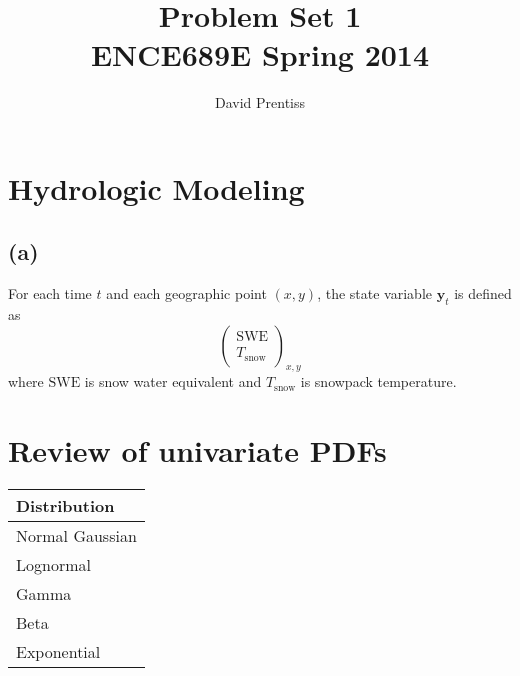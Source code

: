 \documentclass[letterpaper]{tufte-handout}
\title{Problem Set 1 \\ ENCE689E Spring 2014}
\author{David Prentiss}
\begin{document}
\maketitle


\section{Hydrologic Modeling}
\subsection{(a)}
For each time $t$ and each geographic point $(x,y)$, the state variable $\mathbf{y}_t$ is defined as
\[
\begin{pmatrix}
  \text{SWE} \\
  T_{\text{snow}}
\end{pmatrix}_{x,y}
\]
where $\text{SWE}$ is snow water equivalent and $T_{\text{snow}}$ is snowpack temperature.

\section{Review of univariate PDFs}
\begin{tabular}{l}
  Distribution \\
  \hline 
  Normal Gaussian \\
  Lognormal \\
  Gamma \\
  Beta \\
  Exponential \\
\end{tabular}
\end{document}
